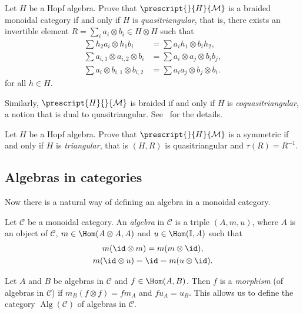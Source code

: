 \documentclass[12pt]{amsproc}
\newcommand{\lmod}[1]{\prescript{}{#1}{\mathcal{M}}}
\newcommand{\lcomod}[1]{\prescript{#1}{}{\mathcal{M}}}
\begin{document}
\begin{exercise}
\label{xca:QT}
    Let $H$ be a Hopf algebra. Prove that 
    $\lmod{H}$ is a braided
    monoidal category if and only if $H$ is \emph{quasitriangular}, that is, there exists an invertible element
    $R=\sum_{i}a_{i}\otimes b_{i}\in H\otimes H$ such that 
\begin{align*}
\sum h_{2}a_{i}\otimes h_{1}b_{i} & =\sum a_{i}h_{1}\otimes b_{i}h_{2},\\
\sum a_{i,1}\otimes a_{i,2}\otimes b_{i} & =\sum a_{i}\otimes a_{j}\otimes b_{i}b_{j},\\
\sum a_{i}\otimes b_{i,1}\otimes b_{i,2} & =\sum a_{i}a_{j}\otimes b_{j}\otimes b_{i}.
\end{align*}
for all $h\in H$. 
\end{exercise} 

Similarly, $\lcomod{H}$ is braided if and only if $H$ is \emph{coquasitriangular}, a notion that is dual to quasitriangular. See~\cite[\S 10.2]{zbMATH00482792} for the details. 

\begin{exercise}
\label{xca:T}
Let $H$ be a Hopf algebra. Prove that 
    $\lmod{H}$ is a symmetric 
    if and only if $H$ is \emph{triangular}, that is 
    $(H,R)$ 
    is quasitriangular 
    and $\tau(R)=R^{-1}$. 
\end{exercise}

\subsection{Algebras in categories}
Now there is a natural way of defining an algebra in a monoidal category. 

\begin{definition}
Let $\mathcal{C}$ be a monoidal category. An \emph{algebra} in
$\mathcal{C}$ is a triple $(A,m,u)$, where $A$ is an object of
$\mathcal{C}$, $m\in\Hom(A\otimes A,A)$ and $u\in\Hom(\mathbb{I},A)$ such that 
\begin{gather*}
m(\id\otimes m)=m(m\otimes\id),\\
m(\id\otimes u)=\id=m(u\otimes\id).
\end{gather*}
\end{definition}

Let $A$ and $B$ be algebras in $\mathcal{C}$ and $f\in\Hom(A,B)$.
Then $f$ is a \emph{morphism} (of algebras in $\mathcal{C}$)
if $m_{B}(f\otimes f)=fm_{A}$ and $fu_{A}=u_{B}$. This allows
us to define the category $\operatorname{Alg}(\mathcal{C})$
of algebras in $\mathcal{C}$. 
\end{document}
